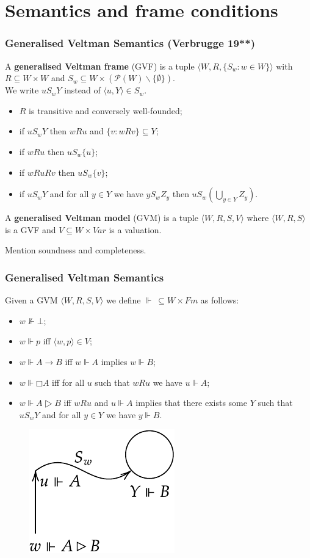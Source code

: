 \documentclass[xcolor={x11names}]{beamer}
\begin{document}
\section{Semantics and frame conditions}
\begin{frame}
  \frametitle{Generalised Veltman Semantics (Verbrugge 19**)}
  A \textbf{generalised Veltman frame} (GVF) is a tuple $⟨W,R,\{S_w:w∈W\}⟩$ with
  $R⊆W×W$ and $S_w⊆W×(𝒫(W)∖\{∅\})$.\\ We write $uS_wY$ instead of $⟨u,Y⟩∈S_w$.
  \begin{itemize}
    \item $R$ is transitive and conversely well-founded;
    \item if $uS_wY$ then $wRu$ and $\{v:wRv\}⊆Y$;
    \item if $wRu$ then $uS_w\{u\}$;
    \item if $wRuRv$ then $uS_w\{v\}$;
    \item if $uS_wY$ and for all $y∈Y$ we have $yS_wZ_y$ then $uS_w\left(⋃_{y∈Y}Z_y\right)$.
  \end{itemize}

  \pause
  \vspace{0.3cm}
  A \textbf{generalised Veltman model} (GVM) is a tuple $⟨W,R,S,V⟩$ where
  $⟨W,R,S⟩$ is a GVF and $V⊆W×Var$ is a valuation.

  Mention soundness and completeness.
\end{frame}

\begin{frame}
  \frametitle{Generalised Veltman Semantics}
  Given a GVM $⟨W,R,S,V⟩$ we define $⊩\ ⊆W×Fm$ as follows:
  \begin{itemize}
    \item $w⊮⊥$;
    \item $w⊩p$ iff $⟨w,p⟩∈V$;
    \item $w⊩A→B$ iff $w⊩A$ implies $w⊩B$;
    \item $w⊩□A$ iff for all $u$ such that $wRu$ we have $u⊩A$;
      \pause
    \item $w⊩A▷B$ iff $wRu$ and $u⊩A$ implies that there exists some $Y$ such
      that $uS_wY$ and for all $y∈Y$ we have $y⊩B$.
  \end{itemize}
  \begin{figure}[t]
    \includegraphics[scale=0.8]{img/a-rhd-b}
    \centering
  \end{figure}
\end{frame}
\end{document}
